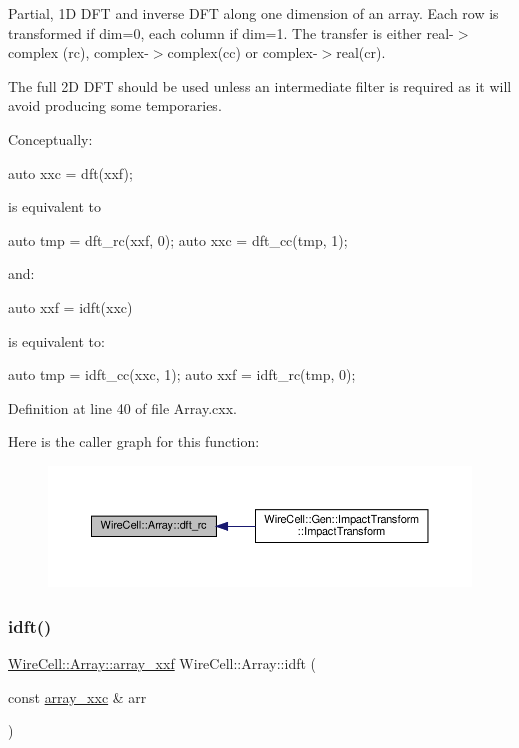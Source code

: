 Partial, 1D D\+FT and inverse D\+FT along one dimension of an array. Each row is transformed if dim=0, each column if dim=1. The transfer is either real-\/$>$complex (rc), complex-\/$>$complex(cc) or complex-\/$>$real(cr).

The full 2D D\+FT should be used unless an intermediate filter is required as it will avoid producing some temporaries.

Conceptually\+:

auto xxc = dft(xxf);

is equivalent to

auto tmp = dft\+\_\+rc(xxf, 0); auto xxc = dft\+\_\+cc(tmp, 1);

and\+: \begin{DoxyVerb}auto xxf = idft(xxc)
\end{DoxyVerb}


is equivalent to\+: \begin{DoxyVerb}auto tmp = idft_cc(xxc, 1);
auto xxf = idft_rc(tmp, 0);\end{DoxyVerb}
 

Definition at line 40 of file Array.\+cxx.

Here is the caller graph for this function\+:
\nopagebreak
\begin{figure}[H]
\begin{center}
\leavevmode
\includegraphics[width=350pt]{namespace_wire_cell_1_1_array_aa18a99e94f8ba5fdc974ddfdc5778c97_icgraph}
\end{center}
\end{figure}
\mbox{\label{namespace_wire_cell_1_1_array_a7c00f9a4791a2e3ced35753de37a5403}} 
\subsubsection{\texorpdfstring{idft()}{idft()}}
{\footnotesize\ttfamily \hyperlink{namespace_wire_cell_1_1_array_ab565fef5e33632bb02f0ed4be803020c}{Wire\+Cell\+::\+Array\+::array\+\_\+xxf} Wire\+Cell\+::\+Array\+::idft (\begin{DoxyParamCaption}\item[{const \hyperlink{namespace_wire_cell_1_1_array_a4688507545975422d74b9ba78530956a}{array\+\_\+xxc} \&}]{arr }\end{DoxyParamCaption})}



